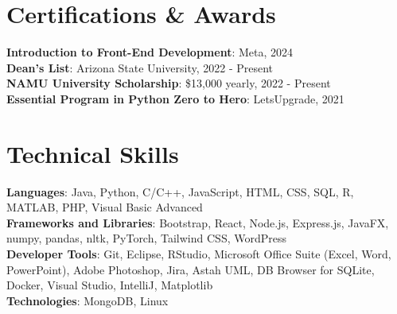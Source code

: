 \documentclass[letterpaper,11pt]{article}
\begin{document}
\section{\textbf{Certifications \& Awards}}
 \begin{itemize}[leftmargin=0.15in, label={}]
    \small{\item{
     \textbf{Introduction to Front-End Development}{: Meta, 2024} \\
     \textbf{Dean’s List}{: Arizona State University, 2022 - Present} \\
     \textbf{NAMU University Scholarship}{: \$13,000 yearly, 2022 - Present} \\
     \textbf{Essential Program in Python Zero to Hero}{: LetsUpgrade, 2021} \\
    }}
 \end{itemize}



\section{\textbf{Technical Skills}}
 \begin{itemize}[leftmargin=0.15in, label={}]
    \small{\item{
     \textbf{Languages}{: Java, Python, C/C++, JavaScript, HTML, CSS, SQL, R, MATLAB, PHP, Visual Basic Advanced} \\
     \textbf{Frameworks and Libraries}{: Bootstrap, React, Node.js, Express.js, JavaFX, numpy, pandas, nltk, PyTorch, Tailwind CSS, WordPress} \\
     \textbf{Developer Tools}{: Git, Eclipse, RStudio, Microsoft Office Suite (Excel, Word, PowerPoint), Adobe Photoshop, Jira, Astah UML, DB Browser for SQLite, Docker, Visual Studio, IntelliJ, Matplotlib} \\
     \textbf{Technologies}{: MongoDB, Linux} \\
    }}
 \end{itemize}

\end{document}
